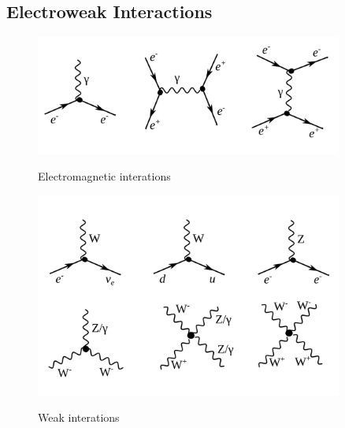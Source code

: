 \subsection{Electroweak Interactions}
\label{sec:Intro_Electroweak}

\begin{figure}[htb]
  \begin{center}
    {\includegraphics[width=0.90\textwidth]{../figs/Intro/feynmEM.png}}
    \caption{Electromagnetic interations}
    \label{fig:feynmEM}
  \end{center}
\end{figure}

\begin{figure}[htb]
  \begin{center}
    {\includegraphics[width=0.90\textwidth]{../figs/Intro/feynmW.png}}
    \caption{Weak interations}
    \label{fig:feynmW}
  \end{center}
\end{figure}


